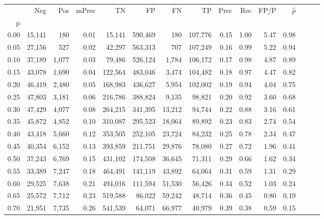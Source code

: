 \begin{tabular}{rrrrrrrrrrrrrrr}
\toprule
{} &     Neg &    Pos & mPrec &       TN &       FP &       FN &       TP &  Prec &   Rec &  FP/P & $\hat{p}$ \\
p    &         &        &       &          &          &          &          &       &       &       &           \\
\midrule
0.00 &  15,141 &    180 &  0.01 &   15,141 &  590,469 &      180 &  107,776 &  0.15 &  1.00 &  5.47 &      0.98 \\
0.05 &  27,156 &    527 &  0.02 &   42,297 &  563,313 &      707 &  107,249 &  0.16 &  0.99 &  5.22 &      0.94 \\
0.10 &  37,189 &  1,077 &  0.03 &   79,486 &  526,124 &    1,784 &  106,172 &  0.17 &  0.98 &  4.87 &      0.89 \\
0.15 &  43,078 &  1,690 &  0.04 &  122,564 &  483,046 &    3,474 &  104,482 &  0.18 &  0.97 &  4.47 &      0.82 \\
0.20 &  46,419 &  2,480 &  0.05 &  168,983 &  436,627 &    5,954 &  102,002 &  0.19 &  0.94 &  4.04 &      0.75 \\
0.25 &  47,803 &  3,181 &  0.06 &  216,786 &  388,824 &    9,135 &   98,821 &  0.20 &  0.92 &  3.60 &      0.68 \\
0.30 &  47,429 &  4,077 &  0.08 &  264,215 &  341,395 &   13,212 &   94,744 &  0.22 &  0.88 &  3.16 &      0.61 \\
0.35 &  45,872 &  4,852 &  0.10 &  310,087 &  295,523 &   18,064 &   89,892 &  0.23 &  0.83 &  2.74 &      0.54 \\
0.40 &  43,418 &  5,660 &  0.12 &  353,505 &  252,105 &   23,724 &   84,232 &  0.25 &  0.78 &  2.34 &      0.47 \\
0.45 &  40,354 &  6,152 &  0.13 &  393,859 &  211,751 &   29,876 &   78,080 &  0.27 &  0.72 &  1.96 &      0.41 \\
0.50 &  37,243 &  6,769 &  0.15 &  431,102 &  174,508 &   36,645 &   71,311 &  0.29 &  0.66 &  1.62 &      0.34 \\
0.55 &  33,389 &  7,247 &  0.18 &  464,491 &  141,119 &   43,892 &   64,064 &  0.31 &  0.59 &  1.31 &      0.29 \\
0.60 &  29,525 &  7,638 &  0.21 &  494,016 &  111,594 &   51,530 &   56,426 &  0.34 &  0.52 &  1.03 &      0.24 \\
0.65 &  25,572 &  7,712 &  0.23 &  519,588 &   86,022 &   59,242 &   48,714 &  0.36 &  0.45 &  0.80 &      0.19 \\
0.70 &  21,951 &  7,735 &  0.26 &  541,539 &   64,071 &   66,977 &   40,979 &  0.39 &  0.38 &  0.59 &      0.15 \\

\end{tabular}
